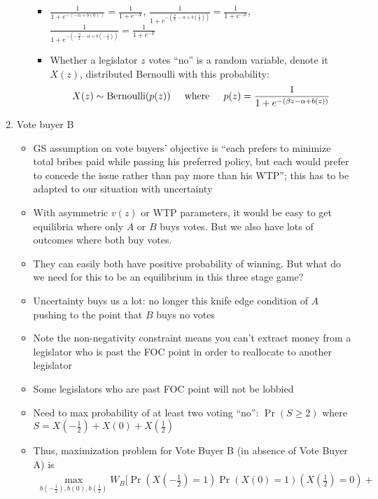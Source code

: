 \documentclass[12pt]{article}
\begin{document}
\begin{enumerate}
\begin{itemize}
\begin{itemize}
					\item $\frac{1}{1+e^{-\left(- \alpha + b(0) \right)}} = \frac{1}{1+e^{-X}}$, $\frac{1}{1+e^{-\left(\frac{\beta}{2}- \alpha + b(\frac{1}{2}) \right)}} = \frac{1}{1+e^{-Z}}$, $\frac{1}{1+e^{-\left(-\frac{\beta}{2}- \alpha + b(-\frac{1}{2}) \right)}} = \frac{1}{1+e^{-Y}}$
					\item Whether a legislator $z$ votes ``no'' is a random variable, denote it $X(z)$, distributed Bernoulli with this probability:
						\[
							X(z) \sim \text{Bernoulli}(p(z)) \hskip.2in \text{where} \hskip.2in p(z) = \frac{1}{1+e^{-\left(\beta z - \alpha + b(z) \right)}}
						\]
				\end{itemize}
		\end{itemize}

\item Vote buyer B
		\begin{itemize}
			\item GS assumption on vote buyers' objective is ``each prefers to minimize total bribes paid while passing his preferred policy, but each would prefer to concede the issue rather than pay more than his WTP''; this has to be adapted to our situation with uncertainty
			\item With asymmetric $v(z)$ or WTP parameters, it would be easy to get equilibria where only $A$ or $B$ buys votes. But we also have lots of outcomes where both buy votes.
			\item They can easily both have positive probability of winning. But what do we need for this to be an equilibrium in this three stage game?
			\item Uncertainty buys us a lot: no longer this knife edge condition of $A$ pushing to the point that $B$ buys no votes
			\item Note the non-negativity constraint means you can't extract money from a legislator who is past the FOC point in order to reallocate to another legislator
			\item Some legislators who are past FOC point will not be lobbied		
			\item Need to max probability of at least two voting ``no'': $\Pr(S \geq 2)$ where $S = X\left(-\frac{1}{2}\right) + X\left(0\right) + X\left(\frac{1}{2}\right)$
			\item Thus, maximization problem for Vote Buyer B (in absence of Vote Buyer A) is
			  \begin{multline}
			    \max_{b\left(-\frac{1}{2}\right), b\left(0\right), b\left(\frac{1}{2}\right)} 
					W_B \biggl[ \Pr\left(X\left(-\frac{1}{2}\right)=1\right)\Pr\left(X\left(0\right)=1\right)\left(X\left(\frac{1}{2}\right)=0\right)  + \\

\end{multline}
\end{itemize}
\end{enumerate}
\end{document}
